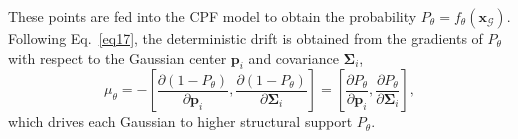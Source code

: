 \documentclass[lettersize,journal]{IEEEtran}
\begin{document}
These points are fed into the CPF model to obtain the probability $P_{\theta}=f_{\theta}(\mathbf{x}_{\mathcal{G}})$. 
Following Eq.~\ref{eq17}, the deterministic drift is obtained from the gradients of $P_{\theta}$ with respect to the Gaussian center $\mathbf{p}_i$ and covariance $\mathbf{\Sigma}_i$,
\begin{equation}
    \mu_{\theta} =  - \left[ \frac{\partial \left( 1 - P_{\theta} \right)}{\partial \mathbf{p}_i}, \frac{\partial \left( 1 - P_{\theta} \right)}{\partial \mathbf{\Sigma}_i} \right] = \left[ \frac{\partial P_{\theta}}{\partial \mathbf{p}_i}, \frac{\partial P_{\theta}}{\partial \mathbf{\Sigma}_i} \right], 
    \label{eq24}
\end{equation}
which drives each Gaussian to higher structural support $P_{\theta}$.
\end{document}
